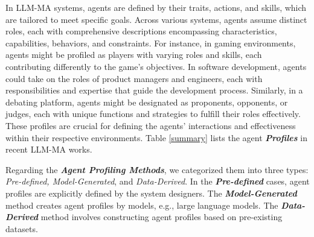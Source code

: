 In LLM-MA systems, agents are defined by their traits, actions, and skills, which are tailored to meet specific goals. Across various systems, agents assume distinct roles, each with comprehensive descriptions encompassing characteristics, capabilities, behaviors, and constraints. For instance, in gaming environments, agents might be profiled as players with varying roles and skills, each contributing differently to the game's objectives. In software development, agents could take on the roles of product managers and engineers, each with responsibilities and expertise that guide the development process. Similarly, in a debating platform, agents might be designated as proponents, opponents, or judges, each with unique functions and strategies to fulfill their roles effectively. These profiles are crucial for defining the agents' interactions and effectiveness within their respective environments. Table \ref{summary} lists the agent \emph{\textbf{Profiles}} in recent LLM-MA works.


Regarding the \emph{\textbf{Agent Profiling Methods}}, we 
categorized them into three types: \emph{Pre-defined, Model-Generated}, and \emph{Data-Derived}.
In the \emph{\textbf{Pre-defined}} cases,  agent profiles are explicitly defined by the system designers. 
The \emph{\textbf{Model-Generated}} method creates agent profiles by models, e.g., large language models. The \emph{\textbf{Data-Derived}} method involves constructing agent profiles based on pre-existing datasets.

